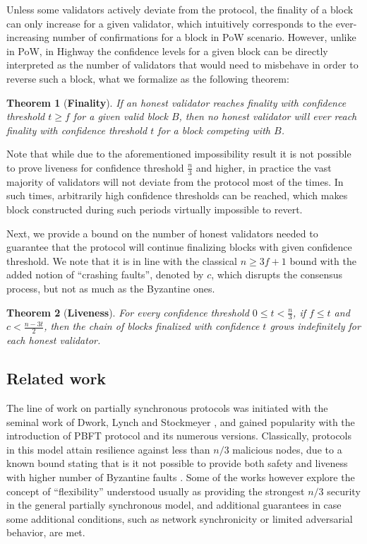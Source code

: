 \documentclass[12pt, fleqn]{article}
\newtheorem{theorem}{Theorem}
\begin{document}
Unless some validators actively deviate from the protocol, the finality of a block can only increase for a given validator, which intuitively corresponds to the ever-increasing number of confirmations for a block in PoW scenario.
However, unlike in PoW, in Highway the confidence levels for a given block can be directly interpreted as the number of validators that would need to misbehave in order to reverse such a block, what we formalize as the following theorem:

\begin{theorem}[\bf Finality]\label{thm:finality}
If an honest validator reaches finality with confidence threshold $t\geq f$ for a given valid block $B$, then no honest validator will ever reach finality with confidence threshold $t$ for a block competing with $B$.
\end{theorem}

Note that while due to the aforementioned impossibility result \cite{DLS88} it is not possible to prove liveness for confidence threshold $\frac{n}{3}$ and higher, in practice the vast majority of validators will not deviate from the protocol most of the times.
In such times, arbitrarily high confidence thresholds can be reached, which makes block constructed during such periods virtually impossible to revert.

Next, we provide a bound on the number of honest validators needed to guarantee that the protocol will continue finalizing blocks with given confidence threshold.
We note that it is in line with the classical $n\geq 3f+1$ bound with the added notion of ``crashing faults'', denoted by $c$, which disrupts the consensus process, but not as much as the Byzantine ones. 

\begin{theorem}[\bf Liveness]\label{thm:liveness}
For every confidence threshold $0 \leq t < \frac{n}{3}$, if $f\leq t$ and $c< \frac{n-3t}{2}$, then the chain of blocks finalized with confidence $t$ grows indefinitely for each honest validator.
\end{theorem}


\subsection{Related work}

The line of work on partially synchronous protocols was initiated with the seminal work of Dwork, Lynch and Stockmeyer \cite{DLS88}, and gained popularity with the introduction of PBFT\cite{CL99} protocol and its numerous versions\cite{BKM18, KADCW09, MNR19}. 
Classically, protocols in this model attain resilience against less than $n/3$ malicious nodes, due to a known bound stating that is it not possible to provide both safety and liveness with higher number of Byzantine faults \cite{DLS88}.
Some of the works however explore the concept of ``flexibility'' understood usually as providing the strongest $n/3$ security in the general partially synchronous model, and additional guarantees in case some additional conditions, such as network synchronicity or limited adversarial behavior, are met.
\end{document}

